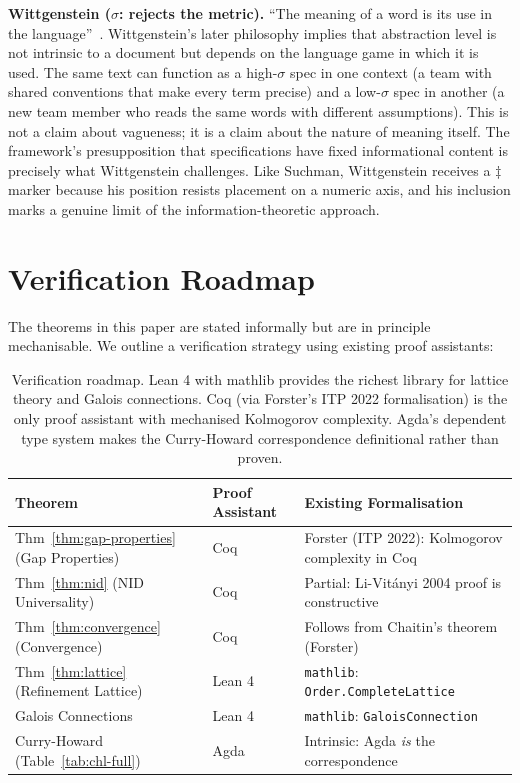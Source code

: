 \documentclass[11pt, a4paper, logo, copyright]{googledeepmind}
\begin{document}
\textbf{Wittgenstein ($\sigma$: rejects the metric).} ``The meaning of a word is its use in the language''~\citep{wittgenstein1953philosophical}. Wittgenstein's later philosophy implies that abstraction level is not intrinsic to a document but depends on the language game in which it is used. The same text can function as a high-$\sigma$ spec in one context (a team with shared conventions that make every term precise) and a low-$\sigma$ spec in another (a new team member who reads the same words with different assumptions). This is not a claim about vagueness; it is a claim about the nature of meaning itself. The framework's presupposition that specifications have fixed informational content is precisely what Wittgenstein challenges. Like Suchman, Wittgenstein receives a $\ddagger$ marker because his position resists placement on a numeric axis, and his inclusion marks a genuine limit of the information-theoretic approach.


\section{Verification Roadmap}
\label{app:verification}

The theorems in this paper are stated informally but are in principle mechanisable. We outline a verification strategy using existing proof assistants:

\begin{table}[H]
\centering
\small
\begin{tabular}{lll}
\toprule
\textbf{Theorem} & \textbf{Proof Assistant} & \textbf{Existing Formalisation} \\
\midrule
Thm~\ref{thm:gap-properties} (Gap Properties) & Coq & Forster (ITP 2022): Kolmogorov complexity in Coq \\
Thm~\ref{thm:nid} (NID Universality) & Coq & Partial: Li-Vit\'{a}nyi 2004 proof is constructive \\
Thm~\ref{thm:convergence} (Convergence) & Coq & Follows from Chaitin's theorem (Forster) \\
Thm~\ref{thm:lattice} (Refinement Lattice) & Lean 4 & \texttt{mathlib}: \texttt{Order.CompleteLattice} \\
Galois Connections & Lean 4 & \texttt{mathlib}: \texttt{GaloisConnection} \\
Curry-Howard (Table~\ref{tab:chl-full}) & Agda & Intrinsic: Agda \emph{is} the correspondence \\
\bottomrule
\end{tabular}
\caption{Verification roadmap. Lean 4 with mathlib provides the richest library for lattice theory and Galois connections. Coq (via Forster's ITP 2022 formalisation) is the only proof assistant with mechanised Kolmogorov complexity. Agda's dependent type system makes the Curry-Howard correspondence definitional rather than proven.}
\label{tab:verification}
\end{table}
\end{document}
